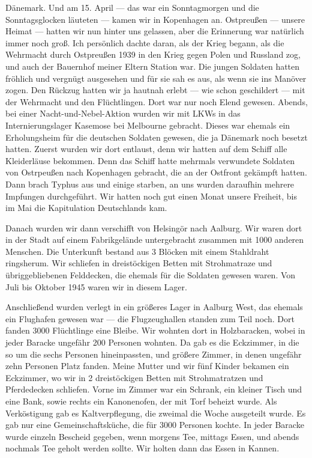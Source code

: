 \documentclass[12pt, twoside]{book}
\begin{document}
Dänemark.
Und am 15. April --- das war ein Sonntagmorgen und die Sonntagsglocken läuteten --- kamen wir in Kopenhagen an.
Ostpreußen --- unsere Heimat --- hatten wir nun hinter uns gelassen, aber die Erinnerung war natürlich immer noch groß. Ich persönlich dachte
daran, als der Krieg begann, als die Wehrmacht durch Ostpreußen 1939 in den Krieg gegen Polen und Russland zog, und auch der Bauernhof meiner Eltern Station war.
Die jungen Soldaten hatten fröhlich und vergnügt ausgesehen und für sie sah es aus, als wenn sie ins Manöver zogen. Den Rückzug hatten wir ja
hautnah erlebt --- wie schon geschildert --- mit der Wehrmacht und den Flüchtlingen. Dort war nur noch Elend gewesen.
Abends, bei einer Nacht-und-Nebel-Aktion wurden wir mit LKWs in das Internierungslager Kasemose bei Melbourne gebracht. Dieses war ehemals ein Erholungsheim für die deutschen
Soldaten gewesen, die ja Dänemark noch besetzt hatten. Zuerst wurden wir dort entlaust, denn wir hatten auf dem Schiff alle Kleiderläuse
bekommen. Denn das Schiff hatte mehrmals verwundete Soldaten von Ostrpeußen nach Kopenhagen gebracht, die an der Ostfront gekämpft hatten.
Dann brach Typhus aus und einige starben, an uns wurden daraufhin mehrere Impfungen durchgeführt. 
Wir hatten noch gut einen Monat unsere Freiheit, bis im Mai die Kapitulation Deutschlands kam.

 Danach wurden wir dann verschifft von Helsingör nach Aalburg. Wir waren dort in der Stadt auf einem Fabrikgelände untergebracht zusammen mit
1000 anderen Menschen. Die Unterkunft bestand aus 3 Blöcken mit einem Stahldraht ringsherum.
Wir schliefen in dreistöckigen Betten mit Strohmatraze und übriggebliebenen Felddecken, die ehemals für die Soldaten gewesen waren.
Von Juli bis Oktober 1945 waren wir in diesem Lager.
 
Anschließend wurden verlegt in ein größeres Lager in Aalburg West, das ehemals ein Flughafen gewesen war --- die Flugzeughallen standen zum Teil noch. Dort fanden 3000 Flüchtlinge eine Bleibe. 
Wir wohnten dort in Holzbaracken, wobei in jeder Baracke ungefähr 200 Personen wohnten. Da gab es die Eckzimmer, in die so um die sechs Personen hineinpassten, und größere Zimmer, in denen ungefähr zehn Personen
Platz fanden. Meine Mutter und wir fünf Kinder bekamen ein Eckzimmer, wo wir in 2 dreistöckigen Betten mit Strohmatratzen und Pferdedecken schliefen. Vorne im Zimmer war ein Schrank, ein kleiner Tisch und eine Bank, sowie rechts ein Kanonenofen, der mit Torf beheizt wurde.
Als Verköstigung gab es Kaltverpflegung, die zweimal die Woche ausgeteilt wurde. Es gab nur eine Gemeinschaftsküche, die für 3000 Personen kochte. In jeder Baracke wurde einzeln Bescheid gegeben, wenn morgens Tee, mittags Essen, und abends nochmals Tee 
geholt werden sollte. 
Wir holten dann das Essen in Kannen.
\end{document}
